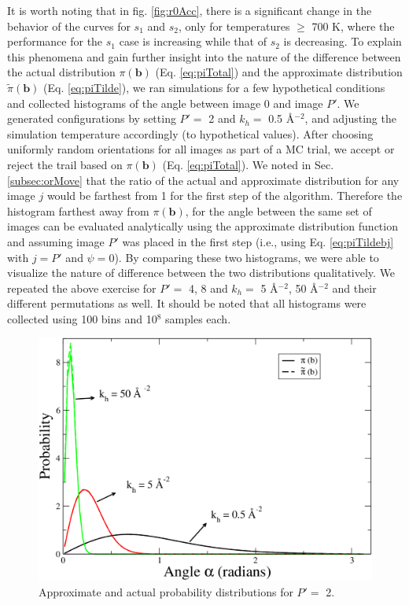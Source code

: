                 It is worth noting that in fig. \ref{fig:r0Acc}, there is a significant change in the behavior of the curves for $s_1$ and $s_2$, only for temperatures $\ge$ 700 K, where the performance for the $s_1$ case is increasing while that of $s_2$ is decreasing. To explain this phenomena and gain further insight into the nature of the difference between the actual distribution $\pi({\mathbf b})$ (Eq. \eqref{eq:piTotal}) and the approximate distribution $\tilde\pi({\mathbf b})$ (Eq. \eqref{eq:piTilde}), we ran simulations for a few hypothetical conditions and collected histograms of the angle between image 0 and image $P'$. We generated configurations by setting $P' = $ 2 and $k_h = $ 0.5 \AA$^{-2}$, and adjusting the simulation temperature accordingly (to hypothetical values). After choosing uniformly random orientations for all images as part of a MC trial, we accept or reject the trail based on $\pi ({\mathbf b})$ (Eq. \eqref{eq:piTotal}). We noted in Sec. \ref{subsec:orMove} that the ratio of the actual and approximate distribution for any image $j$ would be farthest from 1 for the first step of the algorithm. Therefore the histogram farthest away from $\pi ({\mathbf b})$, for the angle between the same set of images can be evaluated analytically using the approximate distribution function and assuming image $P'$ was placed in the first step (i.e., using Eq. \eqref{eq:piTildebj} with $j = P'$ and $\psi = 0$). By comparing these two histograms, we were able to visualize the nature of difference between the two distributions qualitatively. We repeated the above exercise for $P' =$ 4, 8 and $k_h =$ 5 \AA$^{-2}$, 50 \AA$^{-2}$ and their different permutations as well. It should be noted that all histograms were collected using 100 bins and 10$^8$ samples each.

                \begin{figure}[!htbp]
                    \centering
                    \includegraphics[scale=0.20,keepaspectratio]{Chapter-4/Figures/phi2B.png}
                    \caption{Approximate and actual probability distributions for $P' =$ 2.}
                    \label{fig:phi2B}
                \end{figure}

